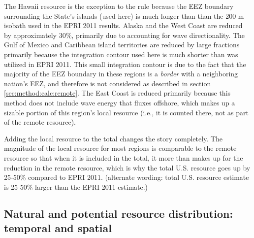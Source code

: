 The Hawaii resource is the exception to the rule because the EEZ boundary surrounding the State's islands (used here) is much longer than than the 200-m isobath used in the EPRI 2011 results.
Alaska and the West Coast are reduced by approximately 30\%, primarily due to accounting for wave directionality.
The Gulf of Mexico and Caribbean island territories are reduced by large fractions primarily because the integration contour used here is much shorter than was utilized in EPRI 2011. This small integration contour is due to the fact that the majority of the EEZ boundary in these regions is a {\it border} with a neighboring nation's EEZ, and therefore is not considered as described in section \ref{sec:method:calc:remote}.
The East Coast is reduced primarily because this method does not include wave energy that fluxes offshore, which makes up a sizable portion of this region's local resource (i.e., it is counted there, not as part of the remote resource).

Adding the local resource to the total changes the story completely. The magnitude of the local resource for most regions is comparable to the remote resource so that when it is included in the total, it more than makes up for the reduction in the remote resource, which is why the total U.S. resource goes up by 25-50\% compared to EPRI 2011. (alternate wording: total U.S. resource estimate is 25-50\% larger than the EPRI 2011 estimate.)


\subsection{Natural and potential resource distribution: temporal and spatial}

